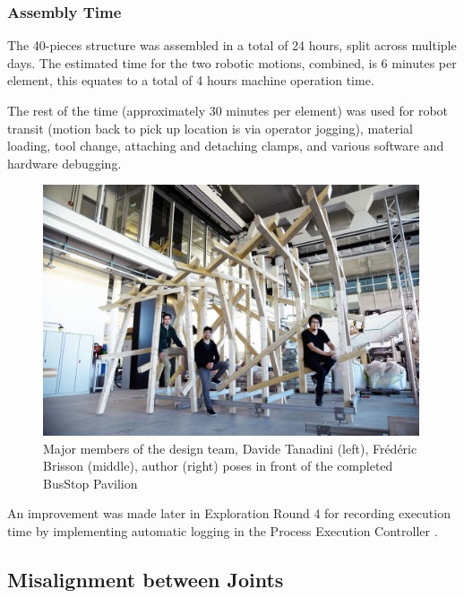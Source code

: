 \subsubsection{Assembly Time}
\label{subsubsection:exploration-2-assembly-time}

The 40-pieces structure was assembled in a total of 24 hours, split across multiple days. The estimated time for the two robotic motions, combined, is 6 minutes per element, this equates to a total of 4 hours machine operation time. 

The rest of the time (approximately 30 minutes per element) was used for robot transit (motion back to pick up location is via operator jogging), material loading, tool change, attaching and detaching clamps, and various software and hardware debugging. 

\begin{figure}
    \centering
    \includegraphics[width=0.99\textwidth]{images/05/image16.jpg}
    \caption[Major members of the design team of the BusStop Pavilion]{Major members of the design team, Davide Tanadini (left), Frédéric Brisson (middle), author (right) poses in front of the completed BusStop Pavilion}
    \label{fig:design-team-photo}
\end{figure}

An improvement was made later in Exploration Round 4 for recording execution time by implementing automatic logging in the Process Execution Controller . 

\subsection{Misalignment between Joints}
\label{subsection:exploration-2-misalignment-between-joints}

